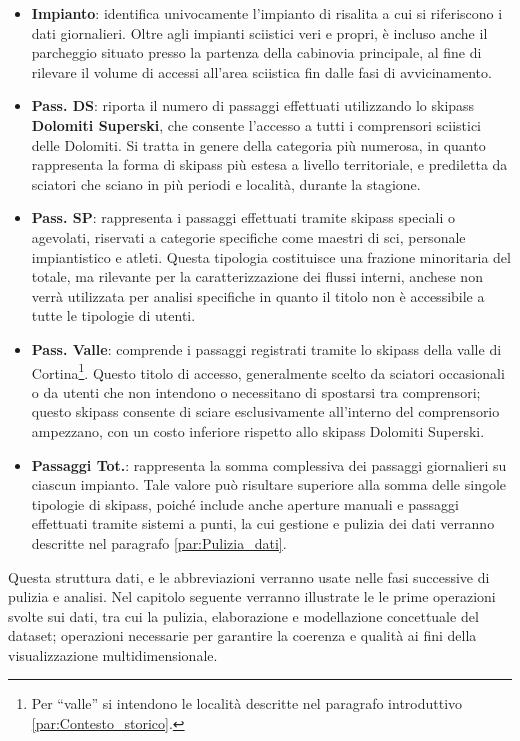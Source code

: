 \begin{itemize}
    \item \textbf{Impianto}: identifica univocamente l’impianto di risalita a cui si riferiscono i dati giornalieri. Oltre agli impianti sciistici veri e propri, è incluso anche il parcheggio situato presso la partenza della cabinovia principale, al fine di rilevare il volume di accessi all’area sciistica fin dalle fasi di avvicinamento.
    
    \item \textbf{Pass. DS}: riporta il numero di passaggi effettuati utilizzando lo skipass \textbf{Dolomiti Superski}, che consente l’accesso a tutti i comprensori sciistici delle Dolomiti. Si tratta in genere della categoria più numerosa, in quanto rappresenta la forma di skipass più estesa a livello territoriale, e prediletta da sciatori che sciano in più periodi e località, durante la stagione.
    
    \item \textbf{Pass. SP}: rappresenta i passaggi effettuati tramite skipass speciali o agevolati, riservati a categorie specifiche come maestri di sci, personale impiantistico e atleti. Questa tipologia costituisce una frazione minoritaria del totale, ma rilevante per la caratterizzazione dei flussi interni, anchese non verrà utilizzata per analisi specifiche in quanto il titolo non è accessibile a tutte le tipologie di utenti.
    
    \item \textbf{Pass. Valle}: comprende i passaggi registrati tramite lo skipass della valle di Cortina\footnote{Per “valle” si intendono le località descritte nel paragrafo introduttivo \ref{par:Contesto_storico}.}. Questo titolo di accesso, generalmente scelto da sciatori occasionali o da utenti che non intendono o necessitano di spostarsi tra comprensori; questo skipass consente di sciare esclusivamente all’interno del comprensorio ampezzano, con un costo inferiore rispetto allo skipass Dolomiti Superski.
    
    \item \textbf{Passaggi Tot.}: rappresenta la somma complessiva dei passaggi giornalieri su ciascun impianto. Tale valore può risultare superiore alla somma delle singole tipologie di skipass, poiché include anche aperture manuali e passaggi effettuati tramite sistemi a punti, la cui gestione e pulizia dei dati verranno descritte nel paragrafo \ref{par:Pulizia_dati}.
\end{itemize}


Questa struttura dati, e le abbreviazioni verranno usate nelle fasi successive di pulizia e analisi.
Nel capitolo seguente verranno illustrate le le prime operazioni svolte sui dati, tra cui la pulizia, elaborazione e modellazione concettuale del dataset; operazioni necessarie per garantire la coerenza e qualità ai fini della visualizzazione multidimensionale.

    
